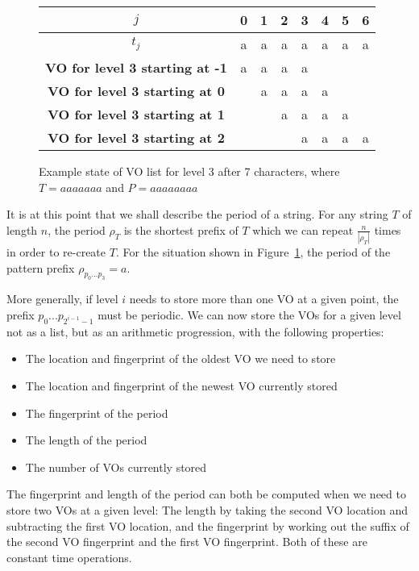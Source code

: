 \documentclass[ %
                    author={Dominic Joseph Moylett},
                supervisor={Dr. Raphael Clifford and Dr. Benjamin Sach},
                    degree={MEng},
                     title={Dictionary Matching with Fingerprints},
                  subtitle={An Empirical Analysis},
                      type={Research},
                      year={2014} ]{dissertation}
\begin{document}
\begin{figure}[t]
\centering
\begin{tabular}{|c|c c c c c c c|}
  \hline
  $j$ & 0 & 1 & 2 & 3 & 4 & 5 & 6 \\
  \hline
  $t_j$ & a & a & a & a & a & a & a \\
  \hline
  \textbf{VO for level 3 starting at -1} & a & a & a & a &  &  &  \\
  \hline
  \textbf{VO for level 3 starting at 0} &  & a & a & a & a &  &  \\
  \hline
  \textbf{VO for level 3 starting at 1} &  &  & a & a & a & a &  \\
  \hline
  \textbf{VO for level 3 starting at 2} &  &  &  & a & a & a & a \\
  \hline
\end{tabular}
\caption{Example state of VO list for level 3 after 7 characters, where $T = aaaaaaa$ and $P = aaaaaaaa$}
\label{fig:pp-level-3}
\end{figure}

It is at this point that we shall describe the period of a string. For any string $T$ of length $n$, the period $\rho_T$ is the shortest prefix of $T$ which we can repeat $\frac{n}{|\rho_T|}$ times in order to re-create $T$. For the situation shown in Figure~\ref{fig:pp-level-3}, the period of the pattern prefix $\rho_{p_0...p_3} = a$.

More generally, if level $i$ needs to store more than one VO at a given point, the prefix $p_0...p_{2^{i-1} - 1}$ must be periodic. We can now store the VOs for a given level not as a list, but as an arithmetic progression, with the following properties:

\begin{itemize}
  \item The location and fingerprint of the oldest VO we need to store
  \item The location and fingerprint of the newest VO currently stored
  \item The fingerprint of the period
  \item The length of the period
  \item The number of VOs currently stored
\end{itemize}

The fingerprint and length of the period can both be computed when we need to store two VOs at a given level: The length by taking the second VO location and subtracting the first VO location, and the fingerprint by working out the suffix of the second VO fingerprint and the first VO fingerprint. Both of these are constant time operations.
\end{document}
